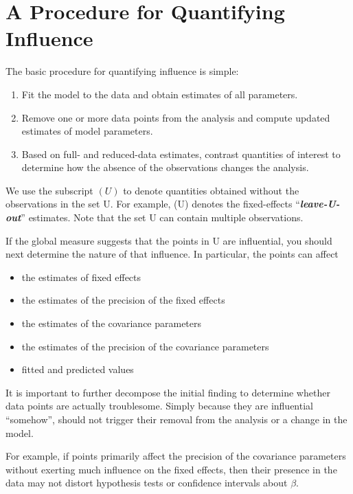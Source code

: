 \documentclass[12pt, a4paper]{report}
\theoremstyle{plain}
\theoremstyle{definition}
\theoremstyle{remark}
\begin{document}
\section{A Procedure for Quantifying Influence}  %


The basic procedure for quantifying influence is simple:

\begin{enumerate}
	\item Fit the model to the data and obtain estimates of all parameters.
	\item Remove one or more data points from the analysis and compute updated estimates of model parameters.
	\item Based on full- and reduced-data estimates, contrast quantities of interest to determine how the absence
	of the observations changes the analysis.
\end{enumerate}
We use the subscript $(U)$ to denote quantities obtained without the observations in the set U. For example,
(U) denotes the fixed-effects “\textit{\textbf{leave-U-out}}” estimates. Note that the set U can contain multiple observations.


If the global measure suggests that the points in U are influential, you should next determine the nature of
that influence. In particular, the points can affect
\begin{itemize}
	\item the estimates of fixed effects
	\item the estimates of the precision of the fixed effects
	\item the estimates of the covariance parameters
	\item the estimates of the precision of the covariance parameters
	\item fitted and predicted values
\end{itemize}

It is important to further decompose the initial finding to determine whether data points are actually troublesome. Simply because they are influential “somehow”, should not trigger their removal from the analysis or a change in the model. 


For example, if points primarily affect the precision of the covariance parameters without exerting much influence on the fixed effects, then their presence in the data may not distort hypothesis
tests or confidence intervals about $\beta$.
\end{document}
